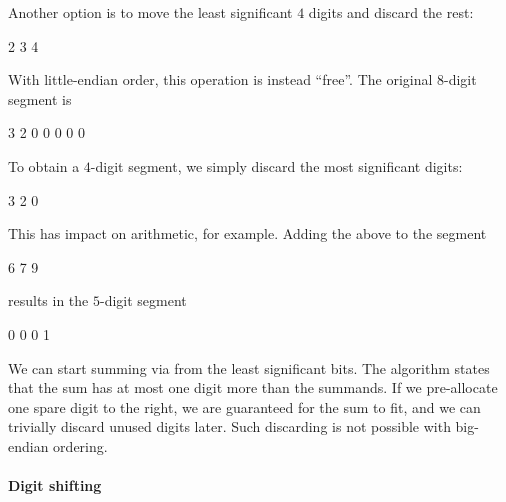 \begin{example}
  Another option is to move the least significant \( 4 \) digits and discard the rest:
  \begin{MemoryLine}
    \MP \MP {} 2 3 4 \MP \MP \MP \MP \MP \MP
  \end{MemoryLine}

  With little-endian order, this operation is instead \enquote{free}. The original \( 8 \)-digit segment is
  \begin{MemoryLine}
    \MP \MP {} 3 2 0 0 0 0 0 \MP \MP
  \end{MemoryLine}

  To obtain a \( 4 \)-digit segment, we simply discard the most significant digits:
  \begin{MemoryLine}
    \MP \MP {} 3 2 0 \MP \MP \MP \MP \MP \MP
  \end{MemoryLine}

  This has impact on arithmetic, for example. Adding the above to the segment
    \begin{MemoryLine}
    \MP \MP {} 6 7 9 \MP \MP \MP \MP \MP \MP
  \end{MemoryLine}
  results in the \( 5 \)-digit segment
  \begin{MemoryLine}
    \MP \MP {} 0 0 0 1 \MP \MP \MP \MP \MP
  \end{MemoryLine}

  We can start summing via  from the least significant bits. The algorithm states that the sum has at most one digit more than the summands. If we pre-allocate one spare digit to the right, we are guaranteed for the sum to fit, and we can trivially discard unused digits later. Such discarding is not possible with big-endian ordering.
\end{example}

\paragraph{Digit shifting}

